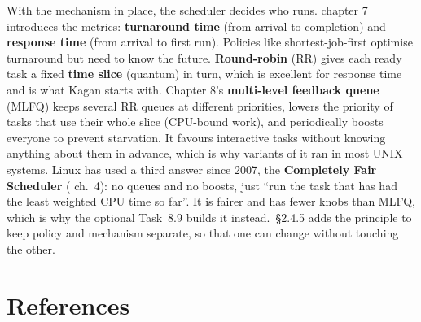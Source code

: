 \documentclass[11pt,a4paper]{article}
\begin{document}
With the mechanism in place, the scheduler decides who runs. \OSTEP chapter 7 introduces the metrics:
\textbf{turnaround time} (from arrival to completion) and \textbf{response time} (from arrival to first run). Policies
like shortest-job-first optimise turnaround but need to know the future. \textbf{Round-robin} (RR) gives each ready
task a fixed \textbf{time slice} (quantum) in turn, which is excellent for response time and is what Kagan starts
with. Chapter 8's \textbf{multi-level feedback queue} (MLFQ) keeps several RR queues at different priorities, lowers
the priority of tasks that use their whole slice (CPU-bound work), and periodically boosts everyone to prevent
starvation. It favours interactive tasks without knowing anything about them in advance, which is why variants of it
ran in most UNIX systems. Linux has used a third answer since 2007, the \textbf{Completely Fair Scheduler} (\LKD
ch.~4): no queues and no boosts, just ``run the task that has had the least weighted CPU time so far''. It is fairer
and has fewer knobs than MLFQ, which is why the optional Task~8.9 builds it instead. \OSDI\,\S2.4.5 adds the principle to keep policy and mechanism separate, so that
one can change without touching the other.

\section{References}
\end{document}
